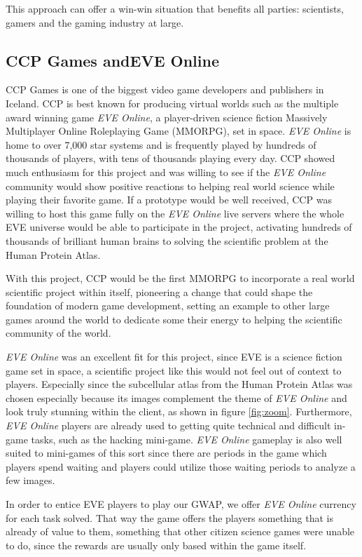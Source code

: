 This approach can offer a win-win situation that benefits all parties: scientists, gamers and the gaming industry at large.

\subsection{CCP Games andEVE Online}

CCP Games \cite{CCP} is one of the biggest video game developers and publishers in Iceland. CCP is best known for producing virtual worlds such as the multiple award winning game \emph{EVE Online}, a player-driven science fiction Massively Multiplayer Online Roleplaying Game (MMORPG), set in space. \emph{EVE Online} is home to over 7,000 star systems and is frequently played by hundreds of thousands of players, with tens of thousands playing every day. CCP showed much enthusiasm for this project and was willing to see if the \emph{EVE Online} community would show positive reactions to helping real world science while playing their favorite game. If a prototype would be well received, CCP was willing to host this game fully on the \emph{EVE Online} live servers where the whole EVE universe would be able to participate in the project, activating hundreds of thousands of brilliant human brains to solving the scientific problem at the Human Protein Atlas.

With this project, CCP would be the first MMORPG to incorporate a real world scientific project within itself, pioneering a change that could shape the foundation of modern game development, setting an example to other large games around the world to dedicate some their energy to helping the scientific community of the world.

\emph{EVE Online} was an excellent fit for this project, since EVE is a science fiction game set in space, a scientific project like this would not feel out of context to players. Especially since the subcellular atlas from the Human Protein Atlas was chosen especially because its images complement the theme of \emph{EVE Online} and look truly stunning within the client, as shown in figure \ref{fig:zoom}. Furthermore, \emph{EVE Online} players are already used to getting quite technical and difficult in-game tasks, such as the hacking mini-game. \emph{EVE Online} gameplay is also well suited to mini-games of this sort since there are periods in the game which players spend waiting and players could utilize those waiting periods to analyze a few images.

In order to entice EVE players to play our GWAP, we offer \emph{EVE Online} currency for each task solved. That way the game offers the players something that is already of value to them, something that other citizen science games were unable to do, since the rewards are usually only based within the game itself.

